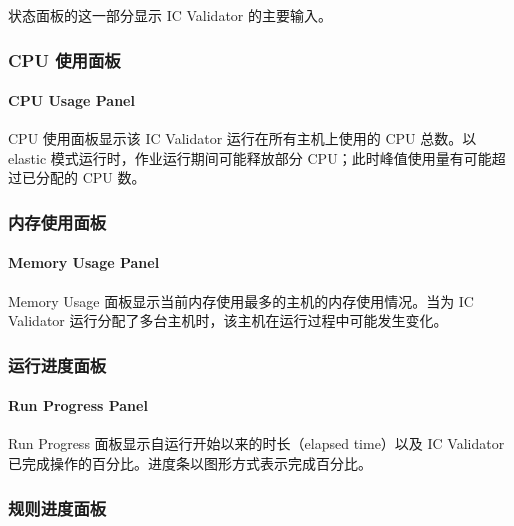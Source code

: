 状态面板的这一部分显示 IC Validator 的主要输入。

\subsubsection{CPU 使用面板}
\paragraph*{CPU Usage Panel}

CPU 使用面板显示该 IC Validator 运行在所有主机上使用的 CPU 总数。以 elastic 模式运行时，作业运行期间可能释放部分 CPU；此时峰值使用量有可能超过已分配的 CPU 数。


\subsubsection{内存使用面板}
\paragraph*{Memory Usage Panel}

Memory Usage 面板显示当前内存使用最多的主机的内存使用情况。当为 IC Validator 运行分配了多台主机时，该主机在运行过程中可能发生变化。


\subsubsection{运行进度面板}
\paragraph*{Run Progress Panel}

Run Progress 面板显示自运行开始以来的时长（elapsed time）以及 IC Validator 已完成操作的百分比。进度条以图形方式表示完成百分比。


\subsubsection{规则进度面板}
